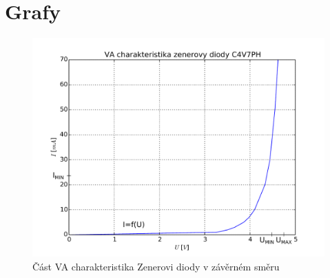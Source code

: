 \section{Grafy}
\setcounter{figure}{0}
  \renewcommand{\figurename}{Graf č.}
  
  \begin{figure}[H]
    \centering
    \includegraphics[width=13cm]{../img/g.pdf}
    \caption{Část VA charakteristika Zenerovi diody v závěrném směru}
    \label{graf:1}
  \end{figure}
